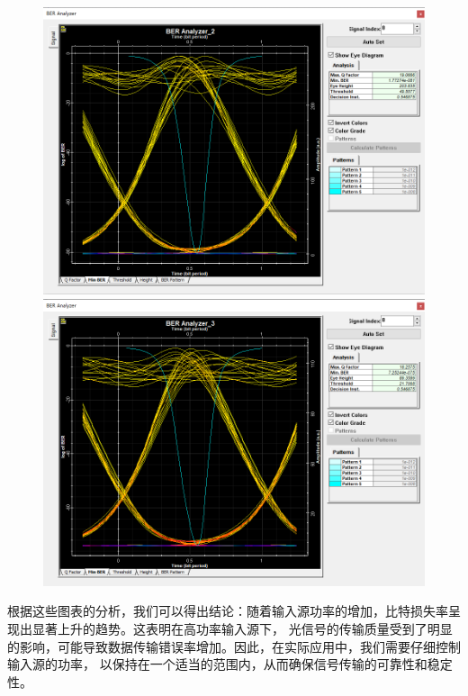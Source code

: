 \documentclass[12pt]{article}
\begin{document}
\begin{figure}[H]
\begin{minipage}[t]{0.5\linewidth}
        \includegraphics[scale=0.2]{sweep2BER3.png}
        \caption{}
        \label{fig:side:a}
      \end{minipage}%
      \begin{minipage}[t]{0.5\linewidth}
        \centering
        \includegraphics[scale=0.2]{sweep2BER4.png}
        \caption{}
        \label{fig:side:b}
      \end{minipage}
\end{figure}

根据这些图表的分析，我们可以得出结论：随着输入源功率的增加，比特损失率呈现出显著上升的趋势。这表明在高功率输入源下，
光信号的传输质量受到了明显的影响，可能导致数据传输错误率增加。因此，在实际应用中，我们需要仔细控制输入源的功率，
以保持在一个适当的范围内，从而确保信号传输的可靠性和稳定性。
\end{document}
